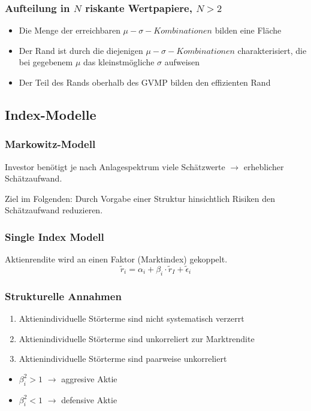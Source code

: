 \subsubsection{Aufteilung in \(N\) riskante Wertpapiere, \(N > 2\)}
\begin{itemize}
	\item Die Menge der erreichbaren \(\mu-\sigma-Kombinationen\) bilden eine Fläche
	\item Der Rand ist durch die diejenigen \(\mu-\sigma-Kombinationen\) charakterisiert, die bei gegebenem \(\mu\) das kleinstmögliche \(\sigma\) aufweisen
	\item Der Teil des Rands oberhalb des GVMP bilden den effizienten Rand
\end{itemize}


\subsection{Index-Modelle}

\subsubsection{Markowitz-Modell}
Investor benötigt je nach Anlagespektrum viele Schätzwerte $\rightarrow$ erheblicher Schätzaufwand.

Ziel im Folgenden: Durch Vorgabe einer Struktur hinsichtlich Risiken den Schätzaufwand reduzieren.

\subsubsection{Single Index Modell}
Aktienrendite wird an einen Faktor (Marktindex) gekoppelt.
\[\tilde{r}_i = \alpha_i + \beta_i \cdot \tilde{r}_I + \tilde{\epsilon}_i\]

\subsubsection{Strukturelle Annahmen}
\begin{enumerate}
	\item Aktienindividuelle Störterme sind nicht systematisch verzerrt
	\item Aktienindividuelle Störterme sind unkorreliert zur Marktrendite
	\item Aktienindividuelle Störterme sind paarweise unkorreliert
\end{enumerate}

\begin{itemize}
	\item \(\beta_i^2 > 1\) $\rightarrow$ aggresive Aktie
	\item \(\beta_i^2 < 1\) $\rightarrow$ defensive Aktie
\end{itemize}

